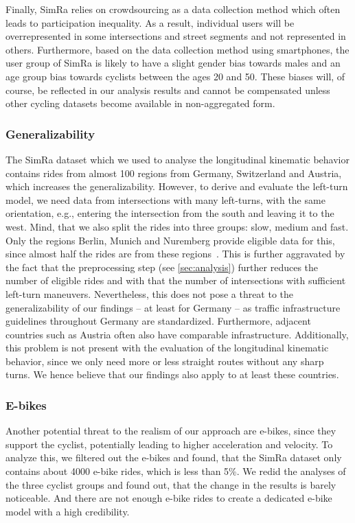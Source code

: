Finally, SimRa relies on crowdsourcing as a data collection method which often leads to participation inequality.
As a result, individual users will be overrepresented in some intersections and street segments and not represented in others.
Furthermore, based on the data collection method using smartphones, the user group of SimRa is likely to have a slight gender bias towards males and an age group bias towards cyclists between the ages \num{20} and \num{50}.
These biases will, of course, be reflected in our analysis results and cannot be compensated unless other cycling datasets become available in non-aggregated form.

\subsubsection{Generalizability}%
\label{subsubsec:problem_general}
The SimRa dataset which we used to analyse the longitudinal kinematic behavior contains rides from almost \num{100} regions from Germany, Switzerland and Austria, which increases the generalizability.
However, to derive and evaluate the left-turn model, we need data from intersections with many left-turns, with the same orientation, e.g., entering the intersection from the south and leaving it to the west.
Mind, that we also split the rides into three groups: slow, medium and fast.
Only the regions Berlin, Munich and Nuremberg provide eligible data for this, since almost half the rides are from these regions~\cite{karakaya2022cyclesense}.
This is further aggravated by the fact that the preprocessing step (see \cref{sec:analysis}) further reduces the number of eligible rides and with that the number of intersections with sufficient left-turn maneuvers.
Nevertheless, this does not pose a threat to the generalizability of our findings -- at least for Germany -- as traffic infrastructure guidelines throughout Germany are standardized.
Furthermore, adjacent countries such as Austria often also have comparable infrastructure.
Additionally, this problem is not present with the evaluation of the longitudinal kinematic behavior, since we only need more or less straight routes without any sharp turns.
We hence believe that our findings also apply to at least these countries.

\subsubsection{E-bikes}
\label{subsubsec:e-bikes}
Another potential threat to the realism of our approach are e-bikes, since they support the cyclist, potentially leading to higher acceleration and velocity.
To analyze this, we filtered out the e-bikes and found, that the SimRa dataset only contains about \num{4000} e-bike rides, which is less than \num{5}\%.
We redid the analyses of the three cyclist groups and found out, that the change in the results is barely noticeable.
And there are not enough e-bike rides to create a dedicated e-bike model with a high credibility.


